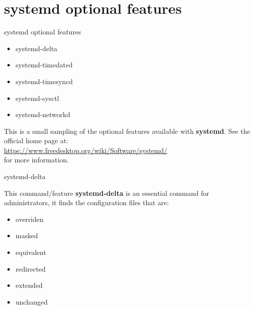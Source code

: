 \section{systemd optional features} 

\begin{frame}
	{systemd optional features}
 
\begin{itemize}
                        \item   systemd-delta
                        \item   systemd-timedated
                        \item   systemd-timesyncd
                        \item   systemd-sysctl
                        \item   systemd-networkd
                \end{itemize}
	This is a small sampling of the optional features available with \textbf{systemd}.
	See the official home page at: \\
	\url{https://www.freedesktop.org/wiki/Software/systemd/} \\
	for more information.
\end{frame} 

\cprotect\note{ 

}


\begin{frame}
	{systemd-delta}

	This command/feature \textbf{systemd-delta} is an 
	essential command for administrators, it finds the configuration 
	files that are: 
	\begin{itemize}
		\item overriden
		\item masked
		\item equivalent
		\item redirected
		\item extended
		\item unchanged
	\end{itemize} 

\end{frame}

\cprotect\note{

	}

